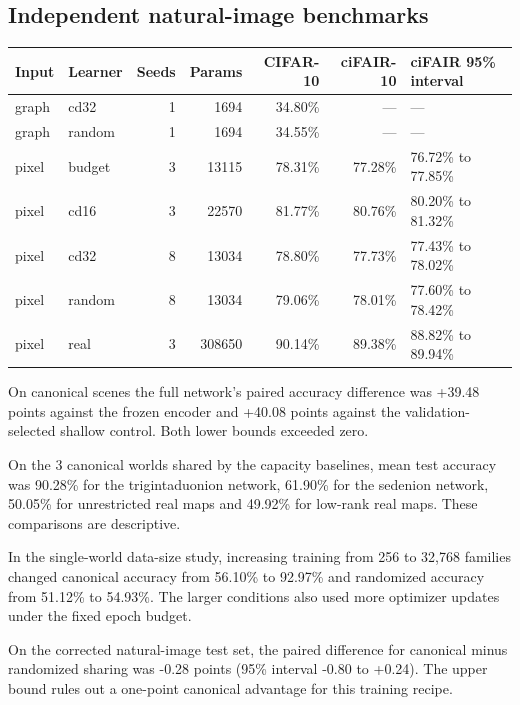 \documentclass[10pt]{article}
\begin{document}
\subsection*{Independent natural-image benchmarks}
\begin{longtable}{llrrrrl}
\hline Input & Learner & Seeds & Params & CIFAR-10 & ciFAIR-10 & ciFAIR 95\% interval\\\hline\endhead\hline\endfoot
graph & cd32 & 1 & 1694 & 34.80\% & --- & ---\\
graph & random & 1 & 1694 & 34.55\% & --- & ---\\
pixel & budget & 3 & 13115 & 78.31\% & 77.28\% & 76.72\% to 77.85\%\\
pixel & cd16 & 3 & 22570 & 81.77\% & 80.76\% & 80.20\% to 81.32\%\\
pixel & cd32 & 8 & 13034 & 78.80\% & 77.73\% & 77.43\% to 78.02\%\\
pixel & random & 8 & 13034 & 79.06\% & 78.01\% & 77.60\% to 78.42\%\\
pixel & real & 3 & 308650 & 90.14\% & 89.38\% & 88.82\% to 89.94\%\\
\end{longtable}
On canonical scenes the full network's paired accuracy difference was +39.48 points against the frozen encoder and +40.08 points against the validation-selected shallow control. Both lower bounds exceeded zero.

On the 3 canonical worlds shared by the capacity baselines, mean test accuracy was 90.28\% for the trigintaduonion network, 61.90\% for the sedenion network, 50.05\% for unrestricted real maps and 49.92\% for low-rank real maps. These comparisons are descriptive.

In the single-world data-size study, increasing training from 256 to 32,768 families changed canonical accuracy from 56.10\% to 92.97\% and randomized accuracy from 51.12\% to 54.93\%. The larger conditions also used more optimizer updates under the fixed epoch budget.

On the corrected natural-image test set, the paired difference for canonical minus randomized sharing was -0.28 points (95\% interval -0.80 to +0.24). The upper bound rules out a one-point canonical advantage for this training recipe.
\end{document}
